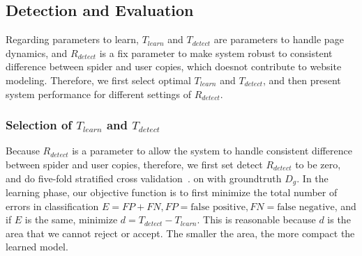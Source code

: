 
%
%
%
%



\subsection{Detection and Evaluation}
Regarding parameters to learn, $T_{learn}$ and $T_{detect}$ are parameters to
handle page dynamics, and $R_{detect}$ is a fix parameter to make system 
robust to consistent difference between spider and user copies, which doesnot
contribute to website modeling. Therefore, 
we first select optimal $T_{learn}$ and $T_{detect}$, and then present
system performance for different settings of $R_{detect}$.

\subsubsection{Selection of $T_{learn}$ and $T_{detect}$}
\label{sss:threshold}
Because $R_{detect}$ is a parameter to allow the system to handle consistent
difference between spider and user copies, therefore, we first set detect
$R_{detect}$ to be zero, and do five-fold stratified cross validation~\cite{scikit-learn}.
on with groundtruth $D_{g}$. In the learning phase,
our objective function is to first minimize the total number of errors in
classification $E = FP + FN, FP = \text{false positive}, FN = \text{false
negative}$, and
if $E$ is the same, minimize $d = T_{detect} - T_{learn}$.
This is reasonable because $d$ is the area that we cannot reject or accept. The smaller
the area, the more compact the learned model.

